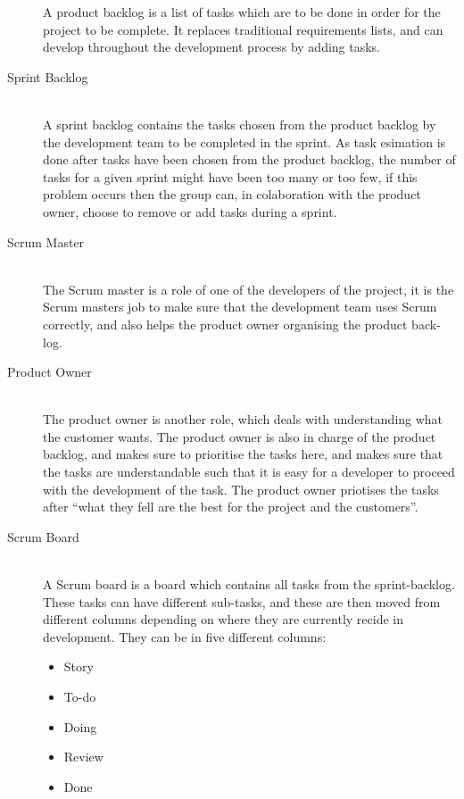 \begin{description}
	A product backlog is a list of tasks which are to be done in order for the project to be complete. 
	It replaces traditional requirements lists, and can develop throughout the development process by adding tasks.
	\item[Sprint Backlog] \hfill \\
	A sprint backlog contains the tasks chosen from the product backlog by the development team to be completed in the sprint.
	As task esimation is done after tasks have been chosen from the product backlog, the number of tasks for a given sprint might have been too many or too few, if this problem occurs then the group can, in colaboration with the product owner, choose to remove or add tasks during a sprint. 
	\item[Scrum Master] \hfill \\
	The Scrum master is a role of one of the developers of the project, it is the Scrum masters job to make sure that the development team uses Scrum correctly, and also helps the product owner organising the product back-log.
	\item[Product Owner] \hfill \\
	The product owner is another role, which deals with understanding what the customer wants.
	The product owner is also in charge of the product backlog, and makes sure to prioritise the tasks here, and makes sure that the tasks are understandable such that it is easy for a developer to proceed with the development of the task.
	The product owner priotises the tasks after ``what they fell are the best for the project and the customers''. 
	\item[Scrum Board] \hfill \\
	A Scrum board is a board which contains all tasks from the sprint-backlog.
	These tasks can have different sub-tasks, and these are then moved from different columns depending on where they are currently recide in development.
	They can be in five different columns:
	\begin{itemize}
		\item Story
		\item To-do
		\item Doing
		\item Review
		\item Done
	\end{itemize}
	\begin{figure}
	  \begin{center}

\end{center}
\end{figure}
\end{description}
